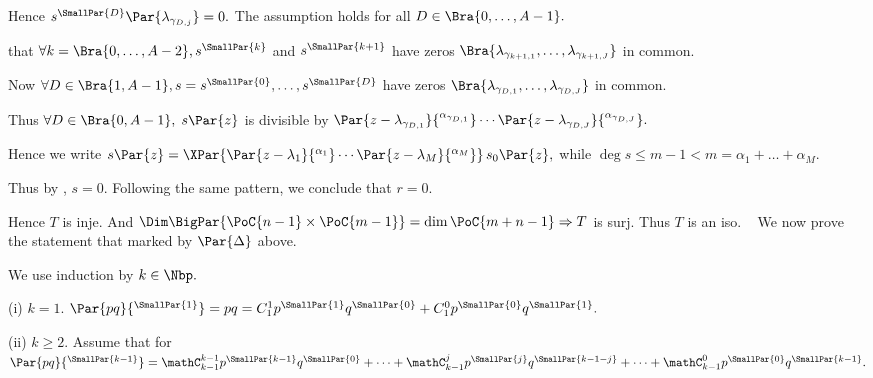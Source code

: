 Hence $s{^{\SmallPar{D}}}\Par{\lambda_{\gamma_{D,j}}}=0.$ The assumption holds for all $D\in\Bra{0,\dots,A-1}.$\vspace{6pt}\par\quad
\NOTICE that $\forall k=\Bra{0,\dots,A-2},s{^{\SmallPar{k}}}$ and $s{^{\SmallPar{k+1}}}$ have zeros $\Bra{\lambda_{\gamma_{k+1,1}},\dots,\lambda_{\gamma_{k+1,J}}}$ in common.\vspace{2pt}\par\quad
Now $\forall D\in\Bra{1,A-1},s=s{^{\SmallPar{0}}},\dots,s{^{\SmallPar{D}}}$ have zeros $\Bra{\lambda_{\gamma_{D,1}},\dots,\lambda_{\gamma_{D,J}}}$ in common.\vspace{2pt}\par\quad
Thus $\forall D\in\Bra{0,A-1},\;s\Par{z}$ is divisible by $\Par{z-\lambda_{\gamma_{D,1}}}{^{\alpha_{\gamma_{D,1}}}}\cdots\Par{z-\lambda_{\gamma_{D,J}}}{^{\alpha_{\gamma_{D,J}}}}.$\vspace{2pt}\par\quad
Hence we write $s\Par{z}=\XPar{\Par{z-\lambda_1}{^{\alpha_1}}\cdots\Par{z-\lambda_M}{^{\alpha_M}}}\,s_0\Par{z},$ while $\deg s\leqslant m-1<m=\alpha_1+\dots+\alpha_M.$\vspace{2pt}\par\quad
Thus by \TIPS, $s=0.$ Following the same pattern, we conclude that $r=0.$\vspace{2pt}\par\quad
Hence $T$ is inje. And $\Dim\BigPar{\PoC{n-1}\times\PoC{m-1}}=\dim\PoC{m+n-1}\Rightarrow T$ is surj. Thus $T$ is an iso.\PfEnd
\SepLine\pagebreak
\Comment\,\,\, We now prove the statement that marked by $\Par{\Delta}$ above.\vspace{6pt}\par
{}\par\quad
We use induction by $k\in\Nbp.$\par\quad
(i) $k=1.$ $\Par{pq}{^{\SmallPar{1}}}=pq=C_{1}^1 p{^{\SmallPar{1}}}q{^{\SmallPar{0}}}+C_{1}^0 p{^{\SmallPar{0}}}q{^{\SmallPar{1}}}.$\par\quad\Endi
(ii) $k\geqslant 2.$ Assume that for $\Par{pq}{^{\SmallPar{k-1}}}=\mathC_{k-1}^{k-1} p{^{\SmallPar{k-1}}}q{^{\SmallPar{0}}}+\dots+\mathC_{k-1}^j p{^{\SmallPar{j}}}q{^{\SmallPar{k-1-j}}}+\dots+\mathC_{k-1}^0 p{^{\SmallPar{0}}}q{^{\SmallPar{k-1}}}.$\vspace{4pt}\par\quad\Hii
